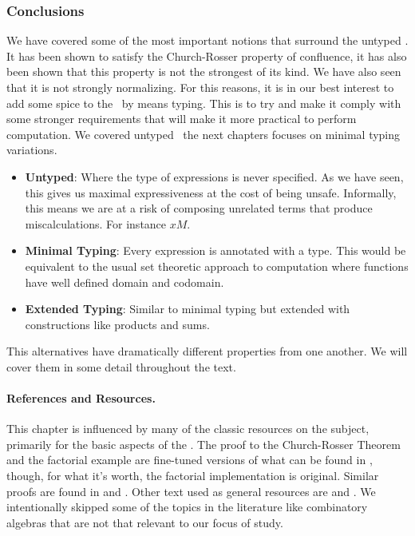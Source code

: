 \subsubsection*{\centering Conclusions}
We have covered some of the most important notions that surround the untyped \lcalc. It has been shown to satisfy the Church-Rosser property of confluence, it has also been shown that this property is not the strongest of its kind. We have also seen that it is not strongly normalizing. For this reasons, it is in our best interest to add some spice to the \lcalc \ by means typing. This is to try and make it comply with some stronger requirements that will make it more practical to perform computation. We covered untyped \lcalc \ the next chapters focuses on minimal typing variations.
\begin{itemize}
\item \textbf{Untyped}: Where the type of expressions is never specified. As we have seen, this gives us maximal expressiveness at the cost of being unsafe. Informally, this means we are at a risk of composing unrelated terms that produce miscalculations. For instance $x M$.
\item \textbf{Minimal Typing}: Every expression is annotated with a type. This would be equivalent to the usual set theoretic approach to computation where functions have well defined domain and codomain.
\item \textbf{Extended Typing}: Similar to minimal typing but extended with constructions like products and sums.
\end{itemize}
This alternatives have dramatically different properties from one another. We will cover them in some detail throughout the text.


\paragraph{References and Resources.}{
  This chapter is influenced by many of the classic resources on the subject, primarily \cite{nederpelt2014:type-theory} for the basic aspects of the \lcalc. The proof to the Church-Rosser Theorem and the factorial example  are fine-tuned versions of what can be found in \cite{selinger2008:lambdanotes}, though, for what it's worth, the factorial implementation is original. Similar proofs are found in \cite{openlogicparallelbeta2025} and \cite{nagele2016mechanized}. Other text used as general resources are \cite{barendregt2000:intro} and \cite{girard1989:proofs-and-types}. We intentionally skipped some of the topics in the literature like combinatory algebras that are not that relevant to our focus of study.

  
}





